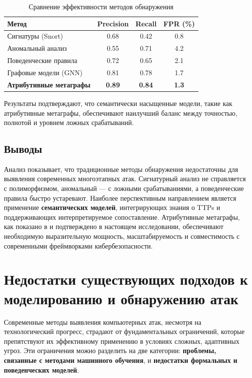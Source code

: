\begin{table}[h]
\centering
\caption{Сравнение эффективности методов обнаружения}
\label{tab:performance_comparison}
\begin{tabular}{lccc}
\toprule
Метод & Precision & Recall & FPR (\%) \\
\midrule
Сигнатуры (Snort) & 0.68 & 0.42 & 0.8 \\
Аномальный анализ & 0.55 & 0.71 & 4.2 \\
Поведенческие правила & 0.72 & 0.65 & 2.1 \\
Графовые модели (GNN) & 0.81 & 0.78 & 1.7 \\
\textbf{Атрибутивные метаграфы} & \textbf{0.89} & \textbf{0.84} & \textbf{1.3} \\
\bottomrule
\end{tabular}
\end{table}

Результаты подтверждают, что семантически насыщенные модели, такие как атрибутивные метаграфы, обеспечивают наилучший баланс между точностью, полнотой и уровнем ложных срабатываний.

\subsection{Выводы}

Анализ показывает, что традиционные методы обнаружения недостаточны для выявления современных многоэтапных атак. Сигнатурный анализ не справляется с полиморфизмом, аномальный — с ложными срабатываниями, а поведенческие правила быстро устаревают. Наиболее перспективным направлением является применение \textbf{семантических моделей}, интегрирующих знания о TTPs и поддерживающих интерпретируемое сопоставление. Атрибутивные метаграфы, как показано в \cite{Latypov2020} и подтверждено в настоящем исследовании, обеспечивают необходимую выразительную мощность, масштабируемость и совместимость с современными фреймворками кибербезопасности.

\section{Недостатки существующих подходов к моделированию и обнаружению атак}

Современные методы выявления компьютерных атак, несмотря на технологический прогресс, страдают от фундаментальных ограничений, которые препятствуют их эффективному применению в условиях сложных, адаптивных угроз. Эти ограничения можно разделить на две категории: \textbf{проблемы, связанные с методами машинного обучения}, и \textbf{недостатки формальных и поведенческих моделей}.

